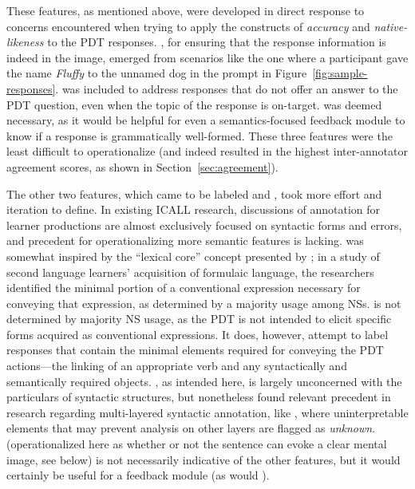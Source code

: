 These features, as mentioned above, were developed in direct response to concerns encountered when trying to apply the constructs of \textit{accuracy} and \textit{native-likeness} to the PDT responses. , for ensuring that the response information is indeed in the image, emerged from scenarios like the one where a participant gave the name \textit{Fluffy} to the unnamed dog in the prompt in Figure~\ref{fig:sample-responses}.  was included to address responses that do not offer an answer to the PDT question, even when the topic of the response is on-target.  was deemed necessary, as it would be helpful for even a semantics-focused feedback module to know if a response is grammatically well-formed. These three features were the least difficult to operationalize (and indeed resulted in the highest inter-annotator agreement scores, as shown in Section~\ref{sec:agreement}).

The other two features, which came to be labeled  and , took more effort and iteration to define. In existing ICALL research, discussions of annotation for learner productions are almost exclusively focused on syntactic forms and errors, and precedent for operationalizing more semantic features is lacking.  was somewhat inspired by the ``lexical core'' concept presented by \citet{bardovi2017unconventional}; in a study of second language learners' acquisition of formulaic language, the researchers identified the minimal portion of a conventional expression necessary for conveying that expression, as determined by a majority usage among NSs.  is not determined by majority NS usage, as the PDT is not intended to elicit specific forms acquired as conventional expressions. It does, however, attempt to label responses that contain the minimal elements required for conveying the PDT actions---the linking of an appropriate verb and any syntactically and semantically required objects. , as intended here, is largely unconcerned with the particulars of syntactic structures, but nonetheless found relevant precedent in research regarding multi-layered syntactic annotation, like \citet{ragheb2014building}, where uninterpretable elements that may prevent analysis on other layers are flagged as \textit{unknown}.  (operationalized here as whether or not the sentence can evoke a clear mental image, see below) is not necessarily indicative of the other features, but it would certainly be useful for a feedback module (as would ).

